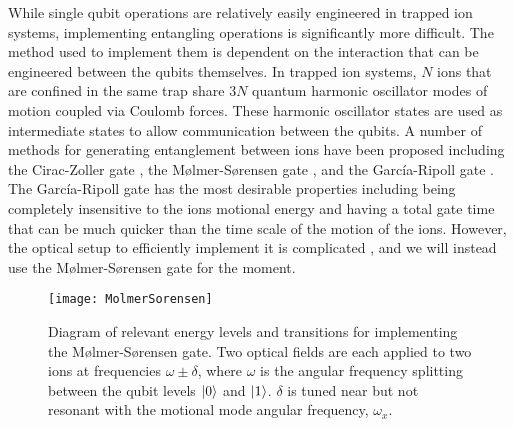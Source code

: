 While single qubit operations are relatively easily engineered in trapped ion systems, implementing entangling operations is significantly more difficult.  The method used to implement them is dependent on the interaction that can be engineered between the qubits themselves.  In trapped ion systems, $N$ ions that are confined in the same trap share $3N$ quantum harmonic oscillator modes of motion coupled via Coulomb forces.  These harmonic oscillator states are used as intermediate states to allow communication between the qubits.  A number of methods for generating entanglement between ions have been proposed including the Cirac-Zoller gate \cite{Cirac:95}, the M{\o}lmer-S{\o}rensen gate \cite{Sorensen:00}, and the Garc\'{i}a-Ripoll gate \cite{GarciaRipoll:03}.  The Garc\'{i}a-Ripoll gate has the most desirable properties including being completely insensitive to the ions motional energy and having a total gate time that can be much quicker than the time scale of the motion of the ions.  However, the optical setup to efficiently implement it is complicated \cite{Mizrahi:13}, and we will instead use the M{\o}lmer-S{\o}rensen gate for the moment.

\begin{figure}
	\centering
	\texttt{[image: MolmerSorensen]}
	\caption[Diagram of M\o{}lmer-S\o{}rensen gate]{Diagram of relevant energy levels and transitions for implementing the M\o{}lmer-S\o{}rensen gate.  Two optical fields are each applied to two ions at frequencies $\omega \pm \delta$, where $\omega$ is the angular frequency splitting between the qubit levels $\left| 0 \right>$ and $\left| 1 \right>$.  $\delta$ is tuned near but not resonant with the motional mode angular frequency, $\omega_x$.}
	\label{fig:molmersorensen}
\end{figure}

